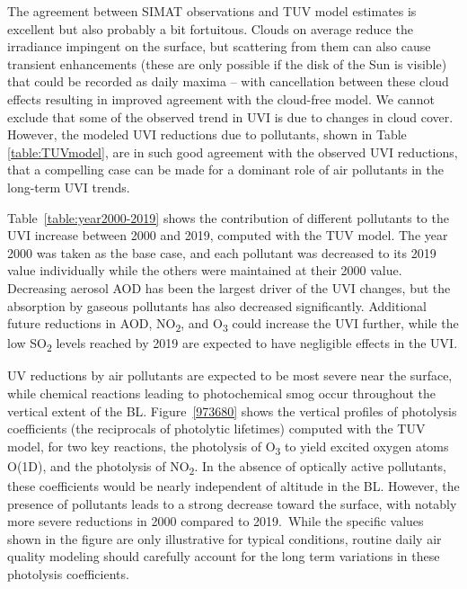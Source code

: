 \documentclass[journal=jacsat,manuscript=article]{achemso}
\begin{document}
The agreement between SIMAT observations and TUV model estimates is
excellent but also probably a bit fortuitous. Clouds on average reduce
the irradiance impingent on the surface, but scattering from them can
also cause transient enhancements (these are only possible if the disk of the Sun is visible)
that could be recorded as daily maxima -- with cancellation
between these cloud effects resulting in improved agreement with the
cloud-free model. We cannot exclude that some of the observed trend in
UVI is due to changes in cloud cover. However, the modeled
UVI reductions due to pollutants, shown in Table
  {\ref{table:TUVmodel}}, are in such good agreement with
the observed UVI reductions, that a compelling case can be made for a
dominant role of air pollutants in the long-term UVI trends.

Table~{\ref{table:year2000-2019}} shows the contribution of different pollutants
to the UVI increase between 2000 and 2019, computed with the TUV model.
The year 2000 was taken as the base case, and each pollutant was decreased
to its 2019 value individually while the others were maintained at their 2000 value.
Decreasing aerosol AOD has been the largest driver of the UVI changes,
but the absorption by gaseous pollutants has also decreased significantly.
Additional future reductions in AOD, NO\textsubscript{2}, and O\textsubscript{3} could increase the
UVI further, while the low SO\textsubscript{2} levels reached by 2019 are expected
to have negligible effects in the UVI.

UV reductions by air pollutants are expected to be most severe near the
surface, while chemical reactions leading to photochemical smog occur
throughout the vertical extent of the BL.
Figure~{\ref{973680}} shows the vertical profiles of
photolysis coefficients (the reciprocals of photolytic lifetimes) computed with the TUV model, for
two key reactions, the photolysis of O\textsubscript{3} to yield excited
oxygen atoms O(1D), and the photolysis of NO\textsubscript{2}. In the
absence of optically active pollutants, these coefficients would be
nearly independent of altitude in the BL. However, the presence of
pollutants leads to a strong decrease toward the surface, with notably
more severe reductions in 2000 compared to 2019.~While the specific
values shown in the figure are only illustrative for typical conditions,
routine daily air quality modeling should carefully account for the long
term variations in these photolysis coefficients.
\end{document}
